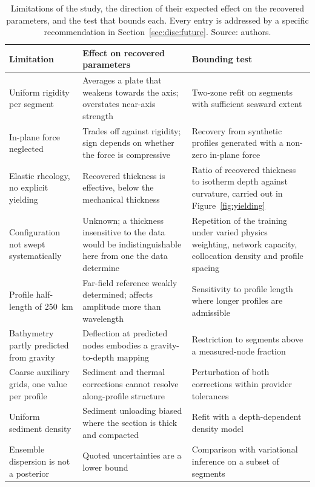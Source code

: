 \documentclass[final]{agujournal2019}
\begin{document}
\begin{table}\centering
  \caption{Limitations of the study, the direction of their expected effect on
  the recovered parameters, and the test that bounds each. Every entry is
  addressed by a specific recommendation in
  Section~\ref{sec:disc:future}. Source: authors.}
  \label{tab:limitations}
  \begin{tabular}{p{}p{}p{}}
    \toprule
    Limitation & Effect on recovered parameters & Bounding test \\
    \midrule
    Uniform rigidity per segment &
    Averages a plate that weakens towards the axis; overstates near-axis
    strength &
    Two-zone refit on segments with sufficient seaward extent \\
    In-plane force neglected &
    Trades off against rigidity; sign depends on whether the force is
    compressive &
    Recovery from synthetic profiles generated with a non-zero in-plane force \\
    Elastic rheology, no explicit yielding &
    Recovered thickness is effective, below the mechanical thickness &
    Ratio of recovered thickness to isotherm depth against curvature,
    carried out in Figure~\ref{fig:yielding} \\
    Configuration not swept systematically &
    Unknown; a thickness insensitive to the data would be indistinguishable
    here from one the data determine &
    Repetition of the training under varied physics weighting, network
    capacity, collocation density and profile spacing \\
    Profile half-length of 250~km &
    Far-field reference weakly determined; affects amplitude more than
    wavelength &
    Sensitivity to profile length where longer profiles are admissible \\
    Bathymetry partly predicted from gravity &
    Deflection at predicted nodes embodies a gravity-to-depth mapping &
    Restriction to segments above a measured-node fraction \\
    Coarse auxiliary grids, one value per profile &
    Sediment and thermal corrections cannot resolve along-profile structure &
    Perturbation of both corrections within provider tolerances \\
    Uniform sediment density &
    Sediment unloading biased where the section is thick and compacted &
    Refit with a depth-dependent density model \\
    Ensemble dispersion is not a posterior &
    Quoted uncertainties are a lower bound &
    Comparison with variational inference on a subset of segments \\
    \bottomrule
  \end{tabular}
\end{table}
\end{document}
